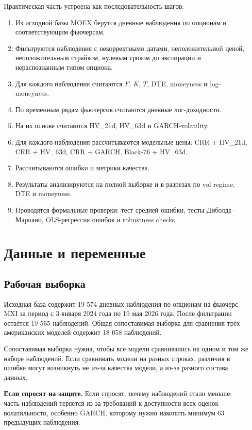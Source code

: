 \documentclass[11pt,a4paper]{article}
\newcommand{\answer}[1]{%
  \vspace{0.15em}
  \noindent\colorbox{softgreen}{%
    \parbox{\dimexpr\linewidth-2\fboxsep\relax}{\textbf{Если спросят на защите.} #1}%
  }\vspace{0.2em}
}
\begin{document}
Практическая часть устроена как последовательность шагов:

\begin{enumerate}
    \item Из исходной базы MOEX берутся дневные наблюдения по опционам и соответствующим фьючерсам.
    \item Фильтруются наблюдения с некорректными датами, неположительной ценой, неположительным страйком, нулевым сроком до экспирации и нераспознанным типом опциона.
    \item Для каждого наблюдения считаются $F$, $K$, $T$, DTE, moneyness и log-moneyness.
    \item По временным рядам фьючерсов считаются дневные лог-доходности.
    \item На их основе считаются HV\_21d, HV\_63d и GARCH-volatility.
    \item Для каждого наблюдения рассчитываются модельные цены: CRR + HV\_21d, CRR + HV\_63d, CRR + GARCH, Black-76 + HV\_63d.
    \item Рассчитываются ошибки и метрики качества.
    \item Результаты анализируются на полной выборке и в разрезах по vol regime, DTE и moneyness.
    \item Проводятся формальные проверки: тест средней ошибки, тесты Диболда--Мариано, OLS-регрессия ошибок и robustness checks.
\end{enumerate}

\section{Данные и переменные}

\subsection{Рабочая выборка}

Исходная база содержит 19 574 дневных наблюдения по опционам на фьючерс MXI за период с 3 января 2024 года по 19 мая 2026 года. После фильтрации остаётся 19 565 наблюдений. Общая сопоставимая выборка для сравнения трёх американских моделей содержит 18 058 наблюдений.

Сопоставимая выборка нужна, чтобы все модели сравнивались на одном и том же наборе наблюдений. Если сравнивать модели на разных строках, различия в ошибке могут возникнуть не из-за качества модели, а из-за разного состава данных.

\answer{Если спросят, почему наблюдений стало меньше: часть наблюдений теряется из-за требований к доступности всех оценок волатильности, особенно GARCH, которому нужно накопить минимум 63 предыдущих наблюдения.}
\end{document}
